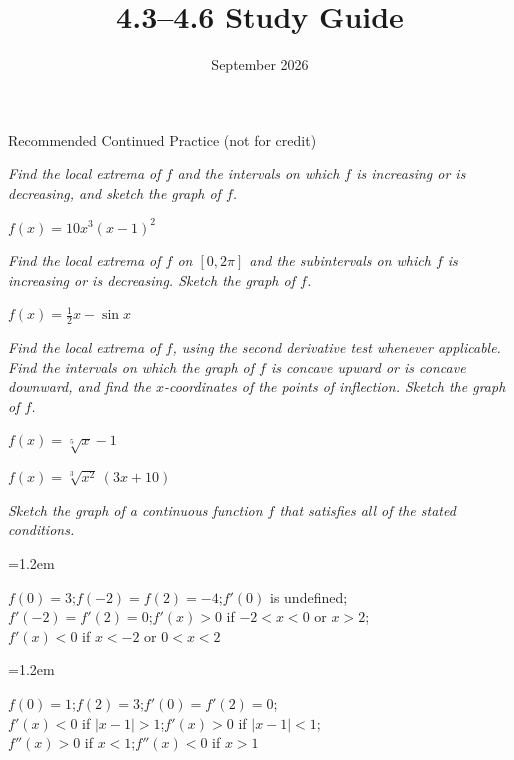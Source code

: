 \documentclass[11pt]{article}
\title{\textbf{4.3--4.6 Study Guide}}
\author{}
\date{September 2026}
\newcommand{\wsL}{\vspace*{6.5cm}}  %
\newcommand{\prob}[1]{\item[\textbf{#1.}]}
\newcommand{\headnote}[1]{\smallskip\noindent\textit{#1}\par\nopagebreak}
\newenvironment{conds}
  {\begin{list}{}{\leftmargin=1.2em\itemsep=1pt\topsep=3pt\parsep=0pt}\item[]}
  {\end{list}}
\begin{document}
\maketitle
\vspace{-2.5em}
\begin{center}\small Recommended Continued Practice (not for credit)\end{center}
\vspace{1em}

\headnote{Find the local extrema of $f$ and the intervals on which $f$ is increasing or is
decreasing, and sketch the graph of $f$.}
\begin{probs}
  \prob{1} $f(x)=10x^{3}(x-1)^{2}$ \wsL
\end{probs}

\headnote{Find the local extrema of $f$ on $[0,2\pi]$ and the subintervals on which $f$ is
increasing or is decreasing. Sketch the graph of $f$.}
\begin{probs}
  \prob{2} $f(x)=\tfrac{1}{2}x-\sin x$ \wsL
\end{probs}

\clearpage

\headnote{Find the local extrema of $f$, using the second derivative test whenever
applicable. Find the intervals on which the graph of $f$ is concave upward or is concave
downward, and find the $x$-coordinates of the points of inflection. Sketch the graph
of $f$.}
\begin{probs}
  \prob{3} $f(x)=\sqrt[5]{x}-1$ \wsL

  \prob{4} $f(x)=\sqrt[3]{x^{2}}\,(3x+10)$ \wsL
\end{probs}

\clearpage

\headnote{Sketch the graph of a continuous function $f$ that satisfies all of the stated
conditions.}
\begin{probs}
  \prob{5}
  \begin{conds}
    $f(0)=3$;\quad $f(-2)=f(2)=-4$;\quad $f'(0)$ is undefined;\\
    $f'(-2)=f'(2)=0$;\quad $f'(x)>0$ if $-2<x<0$ or $x>2$;\\
    $f'(x)<0$ if $x<-2$ or $0<x<2$
  \end{conds}
  \wsL

  \prob{6}
  \begin{conds}
    $f(0)=1$;\quad $f(2)=3$;\quad $f'(0)=f'(2)=0$;\\
    $f'(x)<0$ if $|x-1|>1$;\quad $f'(x)>0$ if $|x-1|<1$;\\
    $f''(x)>0$ if $x<1$;\quad $f''(x)<0$ if $x>1$
  \end{conds}
  \wsL
\end{probs}
\end{document}
